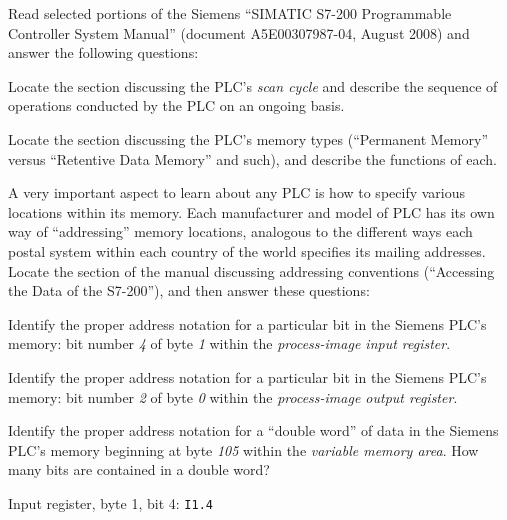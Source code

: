 

Read selected portions of the Siemens ``SIMATIC S7-200 Programmable Controller System Manual'' (document A5E00307987-04, August 2008) and answer the following questions:

\vskip 10pt

Locate the section discussing the PLC's {\it scan cycle} and describe the sequence of operations conducted by the PLC on an ongoing basis.

\vskip 10pt

Locate the section discussing the PLC's memory types (``Permanent Memory'' versus ``Retentive Data Memory'' and such), and describe the functions of each. 

\vskip 30pt

A very important aspect to learn about any PLC is how to specify various locations within its memory.  Each manufacturer and model of PLC has its own way of ``addressing'' memory locations, analogous to the different ways each postal system within each country of the world specifies its mailing addresses.  Locate the section of the manual discussing addressing conventions (``Accessing the Data of the S7-200''), and then answer these questions:

\vskip 10pt

Identify the proper address notation for a particular bit in the Siemens PLC's memory: bit number {\it 4} of byte {\it 1} within the {\it process-image input register}.

\vskip 10pt

Identify the proper address notation for a particular bit in the Siemens PLC's memory: bit number {\it 2} of byte {\it 0} within the {\it process-image output register}.

\vskip 10pt

Identify the proper address notation for a ``double word'' of data in the Siemens PLC's memory beginning at byte {\it 105} within the {\it variable memory area}.  How many bits are contained in a double word?







Input register, byte 1, bit 4: {\tt I1.4}

